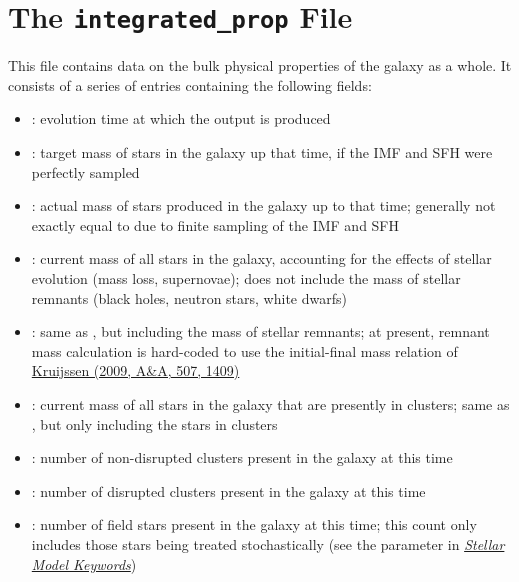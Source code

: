 \documentclass[letterpaper,10pt,english]{sphinxmanual}
\begin{document}
\section{The \texttt{integrated\_prop} File}
\label{output:the-integrated-prop-file}
This file contains data on the bulk physical properties of the galaxy as a whole. It consists of a series of entries containing the following fields:
\begin{itemize}
\item {} 
: evolution time at which the output is produced

\item {} 
: target mass of stars in the galaxy up that time, if the IMF and SFH were perfectly sampled

\item {} 
: actual mass of stars produced in the galaxy up to that time; generally not exactly equal to  due to finite sampling of the IMF and SFH

\item {} 
:  current mass of all stars in the galaxy, accounting for the effects of stellar evolution (mass loss, supernovae); does not include the mass of stellar remnants (black holes, neutron stars, white dwarfs)

\item {} 
: same as , but including the mass of stellar remnants; at present, remnant mass calculation is hard-coded to use the initial-final mass relation of \href{http://adsabs.harvard.edu/abs/2009A\%26A...507.1409K}{Kruijssen (2009, A\&A, 507, 1409)}

\item {} 
: current mass of all stars in the galaxy that are presently in clusters; same as , but only including the stars in clusters

\item {} 
: number of non-disrupted clusters present in the galaxy at this time

\item {} 
: number of disrupted clusters present in the galaxy at this time

\item {} 
: number of field stars present in the galaxy at this time; this count only includes those stars being treated stochastically (see the parameter  in {\hyperref[parameters:ssec\string-stellar\string-keywords]{\emph{Stellar Model Keywords}}})

\end{itemize}
\end{document}

